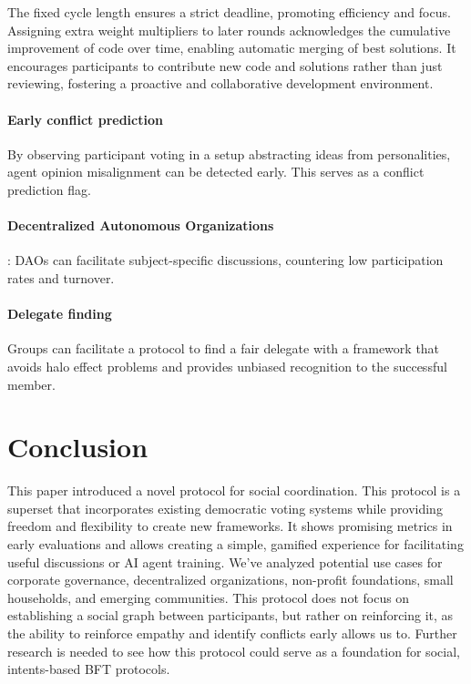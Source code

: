 \documentclass{article}
\begin{document}
\begin{CJK}{UTF8}{gbsn}
\begin{multicols}{2}
        The fixed cycle length ensures a strict deadline, promoting efficiency and focus. Assigning extra weight multipliers to later rounds acknowledges the cumulative improvement of code over time, enabling automatic merging of best solutions. It encourages participants to contribute new code and solutions rather than just reviewing, fostering a proactive and collaborative development environment.

        \paragraph{Early conflict prediction} By observing participant voting in a setup abstracting ideas from personalities, agent opinion misalignment can be detected early. This serves as a conflict prediction flag.
        \paragraph*{Decentralized Autonomous Organizations}: DAOs can facilitate subject-specific discussions, countering low participation rates and turnover.\cite{Rainer2023}\cite{Marcella2016}\cite{Xuan2024}
        \paragraph{Delegate finding} Groups can facilitate a protocol to find a fair delegate with a framework that avoids halo effect problems\cite{Verhulst2010} and provides unbiased recognition to the successful member.

    \end{multicols}
    \section{Conclusion}

    This paper introduced a novel protocol for social coordination. This protocol is a superset that incorporates existing democratic voting systems while providing freedom and flexibility to create new frameworks.
    It shows promising metrics in early evaluations and allows creating a simple, gamified experience for facilitating useful discussions or AI agent training.
    We've analyzed potential use cases for corporate governance, decentralized organizations, non-profit foundations, small households, and emerging communities.
    This protocol does not focus on establishing a social graph between participants, but rather on reinforcing it, as the ability to reinforce empathy and identify conflicts early allows us to.
    Further research is needed to see how this protocol could serve as a foundation for social, intents-based BFT protocols.


    \clearpage

    
    

    \clearpage\end{CJK}
\end{document}
